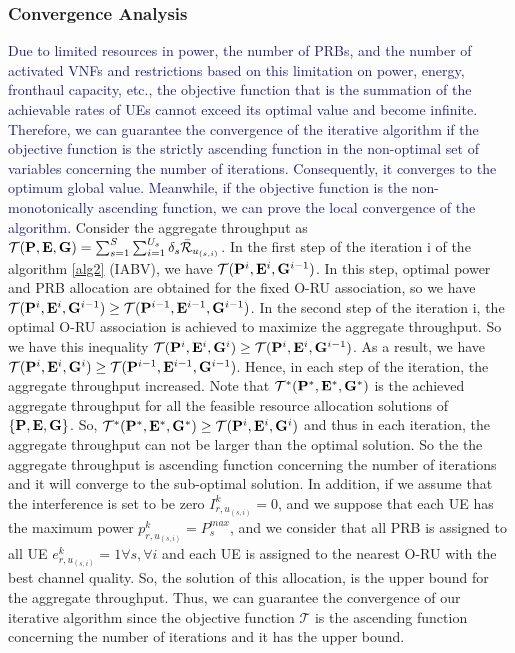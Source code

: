 \documentclass[lettersize,journal]{IEEEtran}
\begin{document}
\subsubsection{Convergence Analysis}
 \textcolor{MidnightBlue}{Due to limited resources in power, the number of PRBs, and the number of activated VNFs and restrictions based on this limitation on power, energy, fronthaul capacity, etc., the objective function that is the summation of the achievable rates of UEs cannot exceed its optimal value and become infinite. Therefore, we can guarantee the convergence of the iterative algorithm if the objective function is the strictly ascending function in the non-optimal set of variables concerning the number of iterations. Consequently, it converges to the optimum global value. Meanwhile, if the objective function is the non-monotonically ascending function, we can prove the local convergence of the algorithm. }
Consider the aggregate throughput as $\mathcal{T(\bold{P},\bold{E},\bold{G})} =\sum_{s=1}^{S}\sum_{i=1}^{U_s}\delta_s \bar{\mathcal{R}}_{u_{(s,i)}}$.
In the first step of the iteration i of the algorithm \ref{alg2} (IABV), we have $\mathcal{T}(\bold{P}^{i},\bold{E}^i,\bold{G}^{i-1})$.
In this step, optimal power and PRB allocation are obtained for the fixed O-RU association, so we have
$\mathcal{T}(\bold{P}^{i},\bold{E}^i,\bold{G}^{i-1}) \geq \mathcal{T}(\bold{P}^{i-1},\bold{E}^{i-1},\bold{G}^{i-1})$.
In the second step of the iteration i, the optimal O-RU association is achieved to maximize the aggregate throughput. So we have this inequality
$\mathcal{T}(\bold{P}^{i},\bold{E}^i,\bold{G}^{i}) \geq \mathcal{T}(\bold{P}^{i},\bold{E}^{i},\bold{G}^{i-1})$.
As a result, we have
$\mathcal{T}(\bold{P}^{i},\bold{E}^i,\bold{G}^{i}) \geq \mathcal{T}(\bold{P}^{i-1},\bold{E}^{i-1},\bold{G}^{i-1})$.
Hence, in each step of the iteration, the aggregate throughput increased.
Note that $\mathcal{T}^*(\bold{P}^{*},\bold{E}^*,\bold{G}^{*})$ is the achieved aggregate throughput
for all the feasible resource allocation solutions of $\{\bold{P},\bold{E},\bold{G}\}$.
So, $\mathcal{T}^*(\bold{P}^{*},\bold{E}^*,\bold{G}^{*}) \geq \mathcal{T}(\bold{P}^{i},\bold{E}^i,\bold{G}^{i})$ and thus in each iteration, the aggregate throughput can not be larger than the optimal solution.
So the the aggregate throughput is ascending function concerning the number of iterations and it will converge to the sub-optimal solution.
In addition, if we assume that the interference is set to be zero ${I}_{r,u_{(s,i)}}^{k}=0$,
and we suppose that each UE has the maximum power $p_{r,u_{(s,i)}}^k = P_{s}^{max}$,
and we consider that all PRB is assigned to all UE $e_{r,u_{(s,i)}}^k = 1 \forall s,\forall i$
and each UE is assigned to the nearest O-RU with the best channel quality. So, the solution of this allocation, is the upper bound
for the aggregate throughput. Thus,
we can guarantee the convergence of our iterative algorithm since the objective function $\mathcal{T}$ is the ascending function concerning the number of iterations
 and it has the upper bound.
\end{document}
